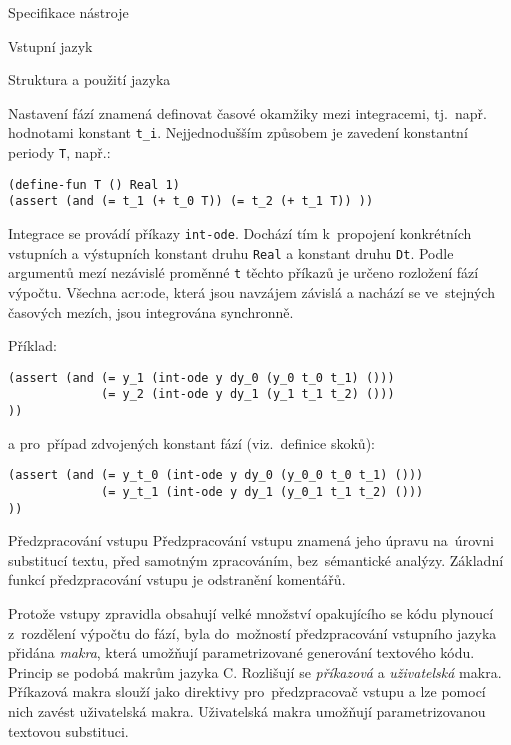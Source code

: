 \documentclass[thesis=M,czech]{FITthesis}[2012/06/26]
\newcommand{\acrlabel}[1]{acr:#1}
\newcommand{\acr}[1]{\acrshort{\acrlabel{#1}}}
\newcommand{\id}[1]{\texttt{#1}}
\newcommand{\hl}[1]{\textit{#1}}
\newcommand{\name}[1]{\hl{#1}}
\begin{document}
\begin{section}{Specifikace nástroje}
\begin{subsection}{Vstupní jazyk}
\begin{subsubsection}{Struktura a použití jazyka}

\begin{paragraph}{Nastavení fází}\label{p:design:spec:ilang:struct:step}
znamená definovat časové okamžiky mezi integracemi,
tj.~např. hodnotami konstant \id{t\_\-i}.
Nejjednodušším způsobem je zavedení
konstantní periody \id{T}, např.:
\begin{Verbatim}[samepage=true]
(define-fun T () Real 1)
(assert (and (= t_1 (+ t_0 T)) (= t_2 (+ t_1 T)) ))
\end{Verbatim}
\end{paragraph} %


\begin{paragraph}{Integrace}\label{p:design:spec:ilang:struct:int}
se provádí příkazy \id{int\--ode}.
Dochází tím k~propojení konkrétních vstupních a výstupních konstant
druhu \id{Real} a konstant druhu \id{Dt}.
Podle argumentů mezí nezávislé proměnné \id{t}
těchto příkazů je určeno rozložení fází výpočtu.
Všechna \acr{ode},
která jsou navzájem závislá
a nachází se ve~stejných časových mezích,
jsou integrována synchronně.

Příklad:
\begin{Verbatim}[samepage=true]
(assert (and (= y_1 (int-ode y dy_0 (y_0 t_0 t_1) ()))
             (= y_2 (int-ode y dy_1 (y_1 t_1 t_2) ()))
))
\end{Verbatim}
a pro~případ zdvojených konstant fází (viz.~definice skoků):
\begin{Verbatim}[samepage=true]
(assert (and (= y_t_0 (int-ode y dy_0 (y_0_0 t_0 t_1) ()))
             (= y_t_1 (int-ode y dy_1 (y_0_1 t_1 t_2) ()))
))
\end{Verbatim}
\end{paragraph} %


\end{subsubsection} %


\begin{subsubsection}{Předzpracování vstupu}
\label{sss:design:spec:ilang:macros}
Předzpracování vstupu znamená jeho úpravu
na~úrovni substitucí textu,
před samotným zpracováním,
bez~sémantické analýzy.
Základní funkcí předzpracování vstupu je odstranění komentářů.

Protože vstupy zpravidla obsahují velké množství opakujícího se kódu
plynoucí z~rozdělení výpočtu do fází,
byla do~možností předzpracování vstupního jazyka přidána \name{makra},
která umožňují parametrizované generování textového kódu.
Princip se podobá makrům jazyka C.
Rozlišují se \hl{příkazová} a \hl{uživatelská} makra.
Příkazová makra slouží jako direktivy pro~předzpracovač vstupu
a lze pomocí nich zavést uživatelská makra.
Uživatelská makra umožňují parametrizovanou textovou substituci.


\end{subsubsection}
\end{subsection}
\end{section}
\end{document}
